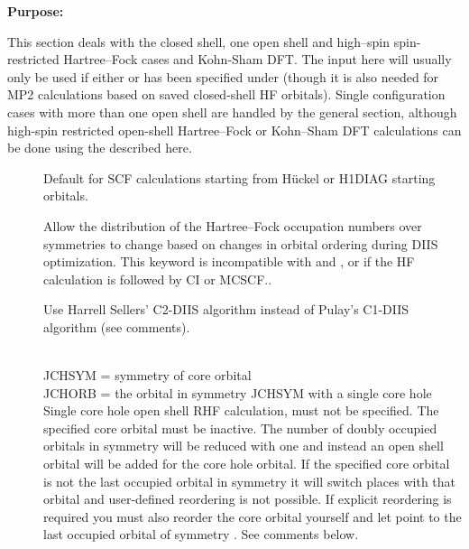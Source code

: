 {\bf Purpose:}

This section deals with the closed shell, one open shell and
high--spin spin-restricted 
Hartree--Fock cases
and Kohn-Sham DFT. 
The input here will usually only be used if either
 or 
has been specified under 
(though it is also needed for MP2 calculations based on saved closed-shell HF
orbitals).
Single configuration cases with more than one open shell
are handled by the general  section, although
high-spin restricted open-shell Hartree--Fock or Kohn--Sham DFT calculations can be done
using the  described here.

\begin{description}
\item[]
  Default for SCF calculations starting from H\"{u}ckel or H1DIAG
  starting orbitals.

  Allow the distribution of the Hartree--Fock occupation numbers over
  symmetries to
  change based on changes in orbital ordering during DIIS optimization.
  This keyword is incompatible with  and , or
  if the HF calculation is followed by CI or MCSCF..


\item[]
  Use Harrell Sellers' C2-DIIS algorithm instead of Pulay's C1-DIIS algorithm
  (see comments).

\item[]
   \\
  JCHSYM = symmetry of core orbital\\
  JCHORB = the orbital in symmetry JCHSYM with a single core hole\\
  Single core hole open shell RHF calculation,  must not
  be specified.  The specified core orbital must be
  inactive.
  The number of doubly occupied orbitals in symmetry  will be reduced with one
  and instead an open shell orbital will be added for the core hole orbital.
  If the specified core orbital is not the last occupied orbital in symmetry
   it will switch places with that orbital and user-defined reordering
  is not possible.
  If explicit reordering is required you must also reorder
  the core orbital yourself and let  point to the last occupied orbital
  of symmetry .  See comments below.


\end{description}
